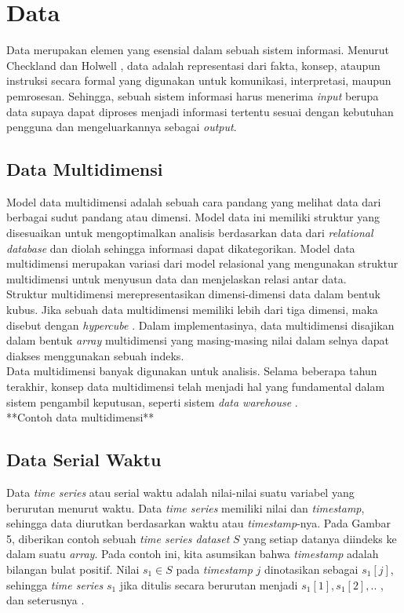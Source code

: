 \section{Data}
\tab Data merupakan elemen yang esensial dalam sebuah sistem informasi. Menurut Checkland dan Holwell \cite{bibid}, data adalah representasi dari fakta, konsep, ataupun instruksi secara formal yang digunakan untuk komunikasi, interpretasi, maupun pemrosesan. Sehingga, sebuah sistem informasi harus menerima \textit{input} berupa data supaya dapat diproses menjadi informasi tertentu sesuai dengan kebutuhan pengguna dan mengeluarkannya sebagai \textit{output}.

\subsection{Data Multidimensi}
\tab Model data multidimensi adalah sebuah cara pandang yang melihat data dari berbagai sudut pandang atau dimensi. Model data ini memiliki struktur yang disesuaikan untuk mengoptimalkan analisis berdasarkan data dari \textit{relational database} dan diolah sehingga informasi dapat dikategorikan. Model data multidimensi merupakan variasi dari model relasional yang mengunakan struktur multidimensi untuk menyusun data dan menjelaskan relasi antar data.\\
\tab Struktur multidimensi merepresentasikan dimensi-dimensi data dalam bentuk kubus. Jika sebuah data multidimensi memiliki lebih dari tiga dimensi, maka disebut dengan \textit{hypercube} \cite{multidimensional-database}. Dalam implementasinya, data multidimensi disajikan dalam bentuk \textit{array} multidimensi yang masing-masing nilai dalam selnya dapat diakses menggunakan sebuah indeks.\\
\tab Data multidimensi banyak digunakan untuk analisis. Selama beberapa tahun terakhir, konsep data multidimensi telah menjadi hal yang fundamental dalam sistem pengambil keputusan, seperti sistem \textit{data warehouse} \cite{multidimensional-database}.\\

**Contoh data multidimensi**

\subsection{Data Serial Waktu}
\tab Data \textit{time series} atau serial waktu adalah nilai-nilai suatu variabel yang berurutan menurut waktu. Data \textit{time series} memiliki nilai dan \textit{timestamp}, sehingga data diurutkan berdasarkan waktu atau \textit{timestamp}-nya. Pada Gambar 5, diberikan contoh sebuah \textit{time series dataset} $S$ yang setiap datanya diindeks ke dalam suatu \textit{array}. Pada contoh ini, kita asumsikan bahwa \textit{timestamp} adalah bilangan bulat positif. Nilai $s_1 \in S$ pada \textit{timestamp} $j$ dinotasikan sebagai $s_1[j]$, sehingga \textit{time series} $s_1$ jika ditulis secara berurutan menjadi $s_1[1], s_1[2],..$ , dan seterusnya \cite{time-series}.\\

